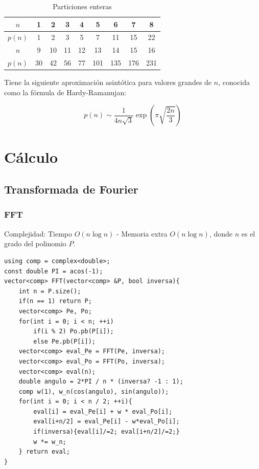 \documentclass[12 pts,spanish,mexico]{article}
\numberwithin{equation}{section}
\begin{document}
\begin{multicols}{2}
\begin{table}[H]
	\centering
	\begin{tabular}{|c|cccccccc|}
		\hline
		$n$ & 1 & 2 & 3 & 4 & 5 & 6 & 7 & 8\\
		\hline
		$p(n)$ & 1 & 2 & 3 & 5 & 7 & 11 & 15 & 22\\
		\hline
		\hline
		$n$ & 9 & 10 & 11 & 12 & 13 & 14 & 15 & 16 \\
		\hline
		 $p(n)$ & 30 & 42 & 56 & 77 & 101 & 135 & 176 & 231\\
		\hline
	\end{tabular}
	\caption{Particiones enteras}
\end{table}

Tiene la siguiente aproximación asintótica para valores grandes de $n$, conocida como la fórmula de Hardy-Ramanujan:

\[
p(n) \sim \frac{1}{4n\sqrt{3}} \exp\left( \pi \sqrt{\frac{2n}{3}} \right)
\]



\section{Cálculo}

\subsection{Transformada de Fourier}
\subsubsection{FFT}
Complejidad: Tiempo $O(n\log n)$ - Memoria extra $O(n\log n)$, donde $n$ es el grado del polinomio $P$.
\begin{verbatim}
using comp = complex<double>;
const double PI = acos(-1);
vector<comp> FFT(vector<comp> &P, bool inversa){
    int n = P.size();
    if(n == 1) return P;
    vector<comp> Pe, Po;
    for(int i = 0; i < n; ++i)
        if(i % 2) Po.pb(P[i]);
        else Pe.pb(P[i]);
    vector<comp> eval_Pe = FFT(Pe, inversa);
    vector<comp> eval_Po = FFT(Po, inversa);
    vector<comp> eval(n);
    double angulo = 2*PI / n * (inversa? -1 : 1);
    comp w(1), w_n(cos(angulo), sin(angulo));
    for(int i = 0; i < n / 2; ++i){
        eval[i] = eval_Pe[i] + w * eval_Po[i];
        eval[i+n/2] = eval_Pe[i] - w*eval_Po[i];
        if(inversa){eval[i]/=2; eval[i+n/2]/=2;}
        w *= w_n;
    } return eval;
}
\end{verbatim}


\end{multicols}
\end{document}
